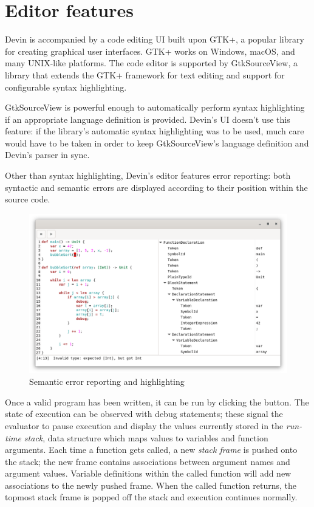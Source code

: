 \documentclass[11pt, american, draft]{PhdThesis}
\begin{document}
  \section{Editor features}

  Devin is accompanied by a code editing UI built upon GTK+, a popular library for creating
  graphical user interfaces. GTK+ works on Windows, macOS, and many UNIX-like platforms\cite{gtk+}.
  The code editor is supported by GtkSourceView, a library that extends the GTK+ framework for text
  editing and support for configurable syntax highlighting\cite{gtksourceview}.

  GtkSourceView is powerful enough to automatically perform syntax highlighting if an appropriate
  language definition is provided. Devin's UI doesn't use this feature: if the library's automatic
  syntax highlighting was to be used, much care would have to be taken in order to keep
  GtkSourceView's language definition and Devin's parser in sync.

  Other than syntax highlighting, Devin's editor features error reporting: both syntactic and
  semantic errors are displayed according to their position within the source code.

  \begin{figure}[H]
    \center
    \includegraphics[width=0.9\linewidth]{4.png}
    \caption{Semantic error reporting and highlighting}
  \end{figure}

  Once a valid program has been written, it can be run by clicking the {\faPlay} button. The state
  of execution can be observed with debug statements; these signal the evaluator to pause execution
  and display the values currently stored in the \emph{run-time stack}, data structure which maps
  values to variables and function arguments. Each time a function gets called, a new \emph{stack
  frame} is pushed onto the stack; the new frame contains associations between argument names and
  argument values. Variable definitions within the called function will add new associations to the
  newly pushed frame. When the called function returns, the topmost stack frame is popped off the
  stack and execution continues normally.
\end{document}
